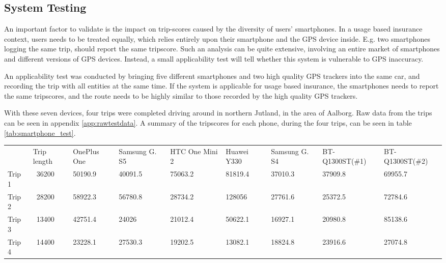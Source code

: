 \subsection{System Testing}\label{subsec:systemtesting}
An important factor to validate is the impact on trip-scores caused by the diversity of users' smartphones. In a usage based insurance context, users needs to be treated equally, which relies entirely upon their smartphone and the GPS device inside. E.g. two smartphones logging the same trip, should report the same tripscore. Such an analysis can be quite extensive, involving an entire market of smartphones and different versions of GPS devices. Instead, a small applicability test will tell whether this system is vulnerable to GPS inaccuracy. 

An applicability test was conducted by bringing five different smartphones and two high quality GPS trackers into the same car, and recording the trip with all entities at the same time. If the system is applicable for usage based insurance, the smartphones needs to report the same tripscores, and the route needs to be highly similar to those recorded by the high quality GPS trackers. 

With these seven devices, four trips were completed driving around in northern Jutland, in the area of Aalborg. Raw data from the trips can be seen in appendix \ref{app:rawtestdata}. A summary of the tripscores for each phone, during the four trips, can be seen in table \ref{tab:smartphone_test}.

\begin{table*}[tb]
\centering
\caption{The tripscores from all seven recording devices, on all four trips used in the test, can be seen in this table}
\label{tab:smartphone_test}
\begin{tabular}{lllllllll}
       & Trip length & OnePlus One & Samsung G. S5 & HTC One Mini 2 & Huawei Y330 & Samsung G. S4 & BT-Q1300ST(\#1) & BT-Q1300ST(\#2) \\
Trip 1 & ~36200 & 50190.9     & 40091.5       & 75063.2        & 81819.4 & 37010.3       & 37909.8         & 69955.7         \\
Trip 2 & ~28200 & 58922.3     & 56780.8       & 28734.2        & 128056  & 27761.6       & 25372.5         & 72784.6         \\
Trip 3 & ~13400 & 42751.4     & 24026         & 21012.4        & 50622.1 & 16927.1       & 20980.8         & 85138.6         \\
Trip 4 & ~14400 & 23228.1     & 27530.3       & 19202.5        & 13082.1 & 18824.8       & 23916.6         & 27074.8        
\end{tabular}
\end{table*}

